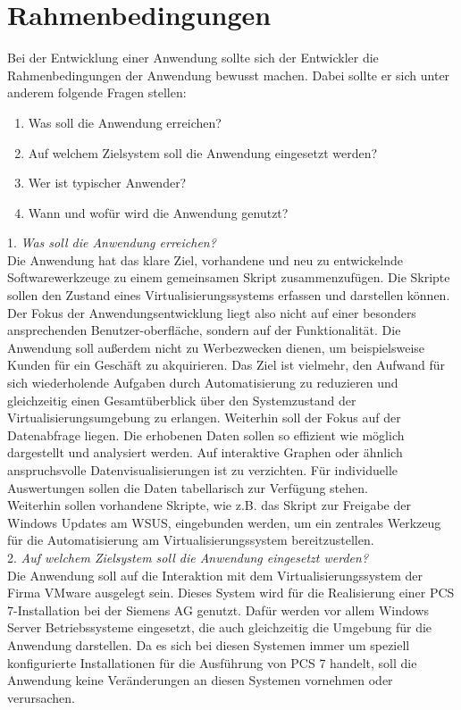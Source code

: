 \section{Rahmenbedingungen}\label{sec:Rahmenbedingungen}
Bei der Entwicklung einer Anwendung sollte sich der Entwickler die Rahmenbedingungen der Anwendung bewusst machen. Dabei sollte er sich unter anderem folgende Fragen stellen:
\begin{enumerate}[noitemsep,topsep=0pt,parsep=0pt,partopsep=0pt]
    \item Was soll die Anwendung erreichen?
    \item Auf welchem Zielsystem soll die Anwendung eingesetzt werden?
    \item Wer ist typischer Anwender?
    \item Wann und wofür wird die Anwendung genutzt?
\end{enumerate}
1. \textit{Was soll die Anwendung erreichen?}\\
Die Anwendung hat das klare Ziel, vorhandene und neu zu entwickelnde Softwarewerkzeuge zu einem gemeinsamen Skript zusammenzufügen. Die Skripte sollen den Zustand eines Virtualisierungssystems erfassen und darstellen können. Der Fokus der Anwendungsentwicklung liegt also nicht auf einer besonders ansprechenden Benutzer-oberfläche, sondern auf der Funktionalität. Die Anwendung soll außerdem nicht zu Werbezwecken dienen, um beispielsweise Kunden für ein Geschäft zu akquirieren. Das Ziel ist vielmehr, den Aufwand für sich wiederholende Aufgaben durch Automatisierung zu reduzieren und gleichzeitig einen Gesamtüberblick über den Systemzustand der Virtualisierungsumgebung zu erlangen. Weiterhin soll der Fokus auf der Datenabfrage liegen. Die erhobenen Daten sollen so effizient wie möglich dargestellt und analysiert werden. Auf interaktive Graphen oder ähnlich anspruchsvolle Datenvisualisierungen ist zu verzichten. Für individuelle Auswertungen sollen die Daten tabellarisch zur Verfügung stehen.\\Weiterhin sollen vorhandene Skripte, wie z.B. das Skript zur Freigabe der Windows Updates am WSUS, eingebunden werden, um ein zentrales Werkzeug für die Automatisierung am Virtualisierungssystem bereitzustellen. \medskip\\
2. \textit{Auf welchem Zielsystem soll die Anwendung eingesetzt werden?}\\
Die Anwendung soll auf die Interaktion mit dem Virtualisierungssystem der Firma VMware ausgelegt sein. Dieses System wird für die Realisierung einer PCS 7-Installation bei der Siemens AG genutzt. Dafür werden vor allem Windows Server Betriebssysteme eingesetzt, die auch gleichzeitig die Umgebung für die Anwendung darstellen. Da es sich bei diesen Systemen immer um speziell konfigurierte Installationen für die Ausführung von PCS 7 handelt, soll die Anwendung keine Veränderungen an diesen Systemen vornehmen oder verursachen.\medskip\\
